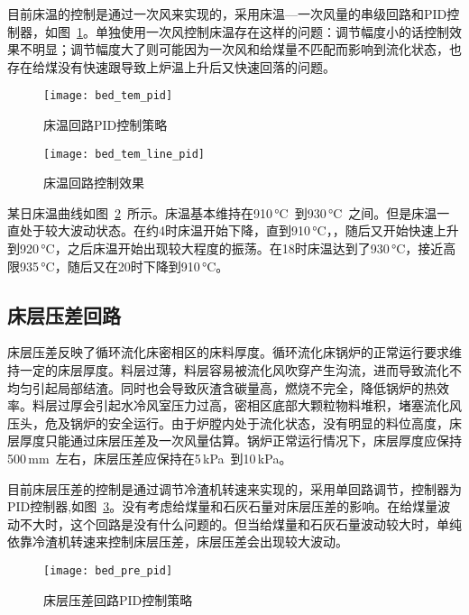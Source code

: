 目前床温的控制是通过一次风来实现的，采用床温—一次风量的串级回路和PID控制器，如图~\ref{fig:bed_tem_pid}。单独使用一次风控制床温存在这样的问题：调节幅度小的话控制效果不明显；调节幅度大了则可能因为一次风和给煤量不匹配而影响到流化状态，也存在给煤没有快速跟导致上炉温上升后又快速回落的问题。
\begin{figure}[!htb]
\centering
\texttt{[image: bed\_tem\_pid]}
\caption{床温回路PID控制策略} \label{fig:bed_tem_pid}
\end{figure}

\begin{figure}[!htb]
\centering
\texttt{[image: bed\_tem\_line\_pid]}
\caption{床温回路控制效果} \label{fig:bed_tem_line_pid}
\end{figure}
 
某日床温曲线如图~\ref{fig:bed_tem_line_pid}~所示。床温基本维持在910$\,$\si{\degreeCelsius}~到930$\,$\si{\degreeCelsius}~之间。但是床温一直处于较大波动状态。在约4时床温开始下降，直到910$\,$\si{\degreeCelsius}，，随后又开始快速上升到920$\,$\si{\degreeCelsius}，之后床温开始出现较大程度的振荡。在18时床温达到了930$\,$\si{\degreeCelsius}，接近高限935$\,$\si{\degreeCelsius}，随后又在20时下降到910$\,$\si{\degreeCelsius}。



\subsection{床层压差回路}

床层压差反映了循环流化床密相区的床料厚度。循环流化床锅炉的正常运行要求维持一定的床层厚度。料层过薄，料层容易被流化风吹穿产生沟流，进而导致流化不均匀引起局部结渣。同时也会导致灰渣含碳量高，燃烧不完全，降低锅炉的热效率。料层过厚会引起水冷风室压力过高，密相区底部大颗粒物料堆积，堵塞流化风压头，危及锅炉的安全运行。由于炉膛内处于流化状态，没有明显的料位高度，床层厚度只能通过床层压差及一次风量估算。锅炉正常运行情况下，床层厚度应保持500$\,$\si{\mm}~左右，床层压差应保持在5$\,$\si{\kilo\pascal}~到10$\,$\si{\kilo\pascal}。
 
目前床层压差的控制是通过调节冷渣机转速来实现的，采用单回路调节，控制器为PID控制器,如图~\ref{fig:bed_pre_pid}。没有考虑给煤量和石灰石量对床层压差的影响。在给煤量波动不大时，这个回路是没有什么问题的。但当给煤量和石灰石量波动较大时，单纯依靠冷渣机转速来控制床层压差，床层压差会出现较大波动。

\begin{figure}[!htb]
\centering
\texttt{[image: bed\_pre\_pid]}
\caption{床层压差回路PID控制策略} \label{fig:bed_pre_pid}
\end{figure}



